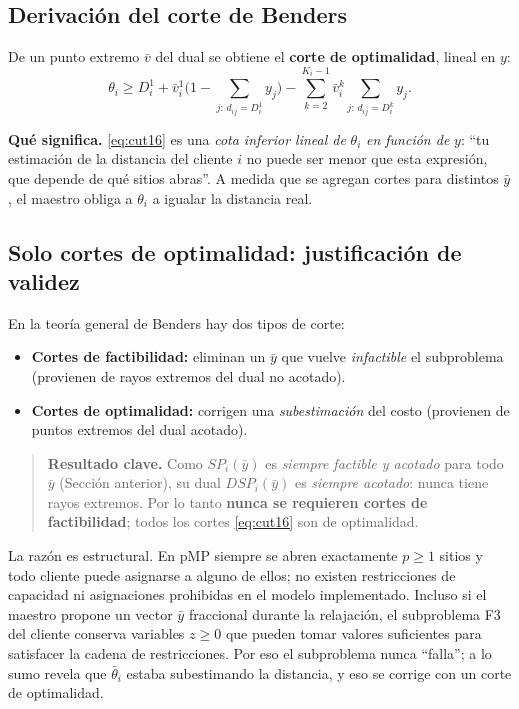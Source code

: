 \subsection{Derivación del corte de Benders}
De un punto extremo $\bar v$ del dual se obtiene el \textbf{corte de optimalidad}, lineal en $y$:
\begin{equation}
  \theta_i \ge D^1_i + \bar v^1_i\Big(1-\!\!\sum_{j:\,d_{ij}=D^1_i}\!\! y_j\Big)
  - \sum_{k=2}^{K_i-1}\bar v^k_i\!\!\sum_{j:\,d_{ij}=D^k_i}\!\! y_j.
  \label{eq:cut16}
\end{equation}

\textbf{Qué significa.} \eqref{eq:cut16} es una \emph{cota inferior lineal de} $\theta_i$ \emph{en
función de} $y$: ``tu estimación de la distancia del cliente $i$ no puede ser menor que esta
expresión, que depende de qué sitios abras''. A medida que se agregan cortes para distintos
$\bar y$, el maestro obliga a $\theta_i$ a igualar la distancia real.

\subsection{Solo cortes de optimalidad: justificación de validez}
\label{sub:optvsfeas}
En la teoría general de Benders hay dos tipos de corte:
\begin{itemize}[noitemsep]
  \item \textbf{Cortes de factibilidad:} eliminan un $\bar y$ que vuelve \emph{infactible} el
        subproblema (provienen de rayos extremos del dual no acotado).
  \item \textbf{Cortes de optimalidad:} corrigen una \emph{subestimación} del costo (provienen de
        puntos extremos del dual acotado).
\end{itemize}

\begin{quote}
\textbf{Resultado clave.} Como $SP_i(\bar y)$ es \emph{siempre factible y acotado} para todo
$\bar y$ (Sección anterior), su dual $DSP_i(\bar y)$ es \emph{siempre acotado}: nunca tiene rayos
extremos. Por lo tanto \textbf{nunca se requieren cortes de factibilidad}; todos los cortes
\eqref{eq:cut16} son de optimalidad.
\end{quote}

La razón es estructural. En pMP siempre se abren exactamente $p\ge1$ sitios y todo cliente puede
asignarse a alguno de ellos; no existen restricciones de capacidad ni asignaciones prohibidas en
el modelo implementado. Incluso si el maestro propone un vector $\bar y$ fraccional durante la
relajación, el subproblema F3 del cliente conserva variables $z\ge0$ que pueden tomar valores
suficientes para satisfacer la cadena de restricciones. Por eso el subproblema nunca ``falla''; a
lo sumo revela que $\bar\theta_i$ estaba subestimando la distancia, y eso se corrige con un corte
de optimalidad.

